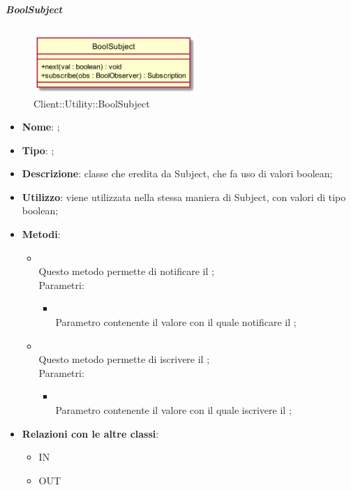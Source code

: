\hypertarget{BoolSubject_label}{\subparagraph{BoolSubject}}
\begin{figure}[h]
	\centering
	\includegraphics[width=0.55\textwidth,height=\textheight,keepaspectratio]{images/ClassBoolSubject.png}
	\caption{Client::Utility::BoolSubject}
\end{figure}
\begin{itemize}
	\item \textbf{Nome}: ;
	\item \textbf{Tipo}: ;
	\item \textbf{Descrizione}: classe che eredita da Subject, che fa uso di valori boolean;
	\item \textbf{Utilizzo}: viene utilizzata nella stessa maniera di Subject, con valori di tipo boolean;
	\item \textbf{Metodi}:
	\begin{itemize}
		\item[]  \\		Questo metodo permette di notificare il ;\\
		Parametri:
		\begin{itemize}
			\item {} \\
			Parametro contenente il valore con il quale notificare il ;
		\end{itemize}
		\item[]  \\		Questo metodo permette di iscrivere il ;\\
		Parametri:
		\begin{itemize}
			\item {} \\
			Parametro contenente il valore con il quale iscrivere il ;
		\end{itemize}
	\end{itemize}
	\item \textbf{Relazioni con le altre classi}:
	\begin{itemize}
		\item IN \hyperlink{Player_label}{}
		\item OUT \hyperlink{BoolObserver_label}{}
	\end{itemize}
\end{itemize}
\FloatBarrier


